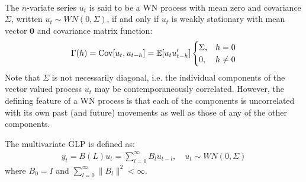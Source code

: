 \begin{definition}\label{def:multivariate-wn}
    \

    The $n$-variate series $u_t$ is said to be a WN process with mean zero and covariance $\Sigma$,
    written $u_t \sim WN(0, \Sigma)$,
    if and only if $u_t$ is weakly stationary with mean vector $\mathbf{0}$ and covariance matrix function:
    \begin{gather*}
        \Gamma(h) = \operatorname{Cov}[u_t, u_{t-h}] = \mathbb{E}[u_t u_{t-h}^{\prime}]\begin{cases}
            \Sigma, & h=0 \\
            0, & h \neq 0
        \end{cases}
    \end{gather*}
    Note that $\Sigma$ is not necessarily diagonal, i.e. the individual components of the vector valued process $u_t$ may be contemporaneously correlated.
    However, the defining feature of a WN process is that each of the components is uncorrelated with its own past (and future) movements as well as those of any of the other components.
\end{definition}
The multivariate GLP is defined as:
\begin{gather*}
    y_t = B(L) u_t = \sum_{l=0}^{\infty} B_l u_{t-l}, \quad u_t \sim WN(0, \Sigma)
\end{gather*}
where $B_0 = I$ and $\sum_{l=0}^{\infty} \lVert B_l \rVert^2 < \infty.$

